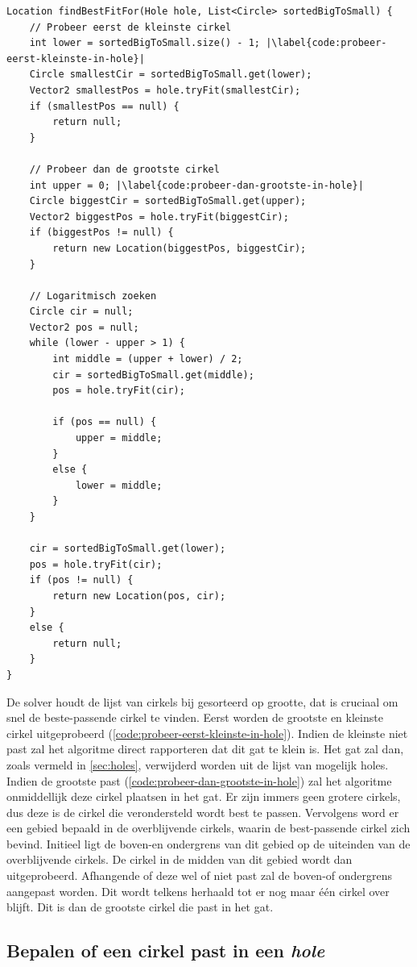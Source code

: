 \documentclass[12pt,a4paper,oneside]{book}
\begin{document}
\begin{lstlisting}
Location findBestFitFor(Hole hole, List<Circle> sortedBigToSmall) {
	// Probeer eerst de kleinste cirkel
	int lower = sortedBigToSmall.size() - 1; |\label{code:probeer-eerst-kleinste-in-hole}|
	Circle smallestCir = sortedBigToSmall.get(lower);
	Vector2 smallestPos = hole.tryFit(smallestCir);
	if (smallestPos == null) {
		return null;
	}

	// Probeer dan de grootste cirkel
	int upper = 0; |\label{code:probeer-dan-grootste-in-hole}|
	Circle biggestCir = sortedBigToSmall.get(upper);
	Vector2 biggestPos = hole.tryFit(biggestCir);
	if (biggestPos != null) {
		return new Location(biggestPos, biggestCir);
	}

	// Logaritmisch zoeken
	Circle cir = null;
	Vector2 pos = null;
	while (lower - upper > 1) {
		int middle = (upper + lower) / 2;
		cir = sortedBigToSmall.get(middle);
		pos = hole.tryFit(cir);

		if (pos == null) {
			upper = middle;
		}
		else {
			lower = middle;
		}
	}

	cir = sortedBigToSmall.get(lower);
	pos = hole.tryFit(cir);
	if (pos != null) {
		return new Location(pos, cir);
	}
	else {
		return null;
	}
}
\end{lstlisting}

De solver houdt de lijst van cirkels bij gesorteerd op grootte, dat is cruciaal om snel de beste-passende cirkel te vinden.
Eerst worden de grootste en kleinste cirkel uitgeprobeerd (\autoref{code:probeer-eerst-kleinste-in-hole}).
Indien de kleinste niet past zal het algoritme direct rapporteren dat dit gat te klein is.
Het gat zal dan, zoals vermeld in \autoref{sec:holes}, verwijderd worden uit de lijst van mogelijk holes.
Indien de grootste past (\autoref{code:probeer-dan-grootste-in-hole}) zal het algoritme onmiddellijk deze cirkel plaatsen in het gat.
Er zijn immers geen grotere cirkels, dus deze is de cirkel die verondersteld wordt best te passen.
Vervolgens word er een gebied bepaald in de overblijvende cirkels, waarin de best-passende cirkel zich bevind.
Initieel ligt de boven-en ondergrens van dit gebied op de uiteinden van de overblijvende cirkels.
De cirkel in de midden van dit gebied wordt dan uitgeprobeerd.
Afhangende of deze wel of niet past zal de boven-of ondergrens aangepast worden.
Dit wordt telkens herhaald tot er nog maar één cirkel over blijft.
Dit is dan de grootste cirkel die past in het gat.

\subsection{Bepalen of een cirkel past in een \textit{hole}} \label{subsec:bepalen-of-een-cirkel-past-in-hole}
\end{document}
